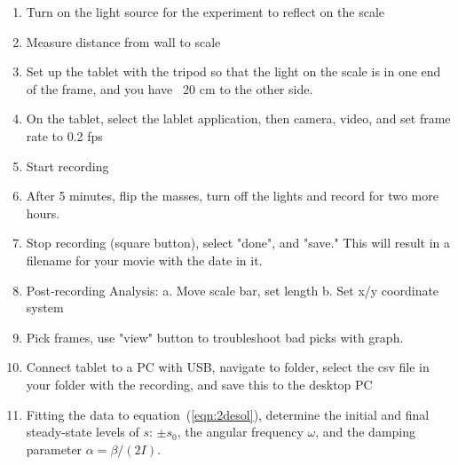 \documentclass{article}
\begin{document}
\begin{enumerate}[resume]
\item Turn on the light source for the experiment to reflect on the scale
\item Measure distance from wall to scale
\item Set up the tablet with the tripod so that the light on the scale is in one end of the frame, and you have ~20 cm to the other side.
\item On the tablet, select the lablet application, then camera, video, and set frame rate to 0.2 fps
\item Start recording
\item After 5 minutes, flip the masses, turn off the lights and record for two more hours.
\item Stop recording (square button), select "done", and "save." This will result in a filename for your movie with the date in it.
\item Post-recording Analysis:
	a. Move scale bar, set length
	b. Set x/y coordinate system
\item Pick frames, use "view" button to troubleshoot bad picks with graph.
\item Connect tablet to a PC with USB, navigate to folder, select the csv file in your folder with the recording, and save this to the desktop PC


  
\item Fitting the data to equation~(\ref{eqn:2desol}), determine the
  initial and final steady-state levels of $s$: $\pm s_{0}$, the
  angular frequency $\omega$, and the damping parameter $\alpha =\beta/(2I)$.


\end{enumerate}
\end{document}
